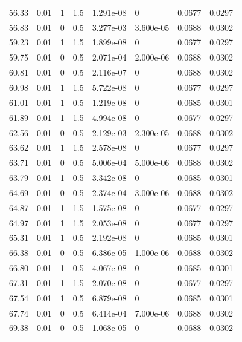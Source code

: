 \documentclass[preview]{standalone}
\begin{document}
{{{\begin{tabular}{L{1.2cm}C{1.2cm} C{0.3cm}C{0.5cm} C{1.4cm}C{1.4cm} C{1.4cm}C{1.4cm}}
  56.33  &  0.01  & 1     & 1.5 &  1.291e-08  & 0  & 0.0677 &  0.0297   \\ 
  56.83  &  0.01  & 0     & 0.5 &  3.277e-03  & 3.600e-05  & 0.0688 &  0.0302   \\ 
  59.23  &  0.01  & 1     & 1.5 &  1.899e-08  & 0  & 0.0677 &  0.0297   \\ 
  59.75  &  0.01  & 0     & 0.5 &  2.071e-04  & 2.000e-06  & 0.0688 &  0.0302   \\ 
  60.81  &  0.01  & 0     & 0.5 &  2.116e-07  & 0  & 0.0688 &  0.0302   \\ 
  60.98  &  0.01  & 1     & 1.5 &  5.722e-08  & 0  & 0.0677 &  0.0297   \\ 
  61.01  &  0.01  & 1     & 0.5 &  1.219e-08  & 0  & 0.0685 &  0.0301   \\ 
  61.89  &  0.01  & 1     & 1.5 &  4.994e-08  & 0  & 0.0677 &  0.0297   \\ 
  62.56  &  0.01  & 0     & 0.5 &  2.129e-03  & 2.300e-05  & 0.0688 &  0.0302   \\ 
  63.62  &  0.01  & 1     & 1.5 &  2.578e-08  & 0  & 0.0677 &  0.0297   \\ 
  63.71  &  0.01  & 0     & 0.5 &  5.006e-04  & 5.000e-06  & 0.0688 &  0.0302   \\ 
  63.79  &  0.01  & 1     & 0.5 &  3.342e-08  & 0  & 0.0685 &  0.0301   \\ 
  64.69  &  0.01  & 0     & 0.5 &  2.374e-04  & 3.000e-06  & 0.0688 &  0.0302   \\ 
  64.87  &  0.01  & 1     & 1.5 &  1.575e-08  & 0  & 0.0677 &  0.0297   \\ 
  64.97  &  0.01  & 1     & 1.5 &  2.053e-08  & 0  & 0.0677 &  0.0297   \\ 
  65.31  &  0.01  & 1     & 0.5 &  2.192e-08  & 0  & 0.0685 &  0.0301   \\ 
  66.38  &  0.01  & 0     & 0.5 &  6.386e-05  & 1.000e-06  & 0.0688 &  0.0302   \\ 
  66.80  &  0.01  & 1     & 0.5 &  4.067e-08  & 0  & 0.0685 &  0.0301   \\ 
  67.31  &  0.01  & 1     & 1.5 &  2.070e-08  & 0  & 0.0677 &  0.0297   \\ 
  67.54  &  0.01  & 1     & 0.5 &  6.879e-08  & 0  & 0.0685 &  0.0301   \\ 
  67.74  &  0.01  & 0     & 0.5 &  6.414e-04  & 7.000e-06  & 0.0688 &  0.0302   \\ 
  69.38  &  0.01  & 0     & 0.5 &  1.068e-05  & 0  & 0.0688 &  0.0302   \\ 

\end{tabular}}}}
\end{document}

